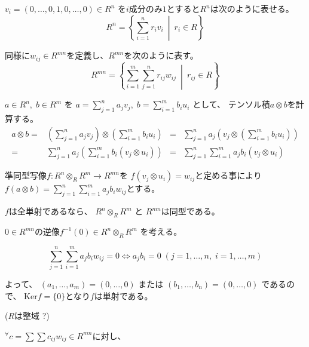 \documentclass[12pt,b5paper]{ltjsarticle}
\begin{document}
\begin{enumerate}
      $v_{i}=(0,\dots,0,1,0,\dots,0) \in R^{n}$
      を$i$成分のみ$1$とすると$R^{n}$は次のように表せる。
      \begin{equation}
       R^{n} = \left \{ \sum_{i=1}^{n} r_{i}v_{i} \:\middle|\: r_{i} \in R \right \}
      \end{equation}

      同様に$w_{ij}\in R^{mn}$を定義し、$R^{mn}$を次のように表す。
      \begin{equation}
       R^{mn} = \left \{ \sum_{i=1}^{m} \sum_{j=1}^{n} r_{ij}w_{ij} \:\middle|\: r_{ij} \in R \right \}
      \end{equation}

      $a\in R^{n}, \; b\in R^{m}$
      を
      $a=\sum_{j=1}^{n}a_{j}v_{j}, \; b=\sum_{i=1}^{m}b_{i}u_{i}$
      として、
      テンソル積$a\otimes b$を計算する。
      \begin{align}
       a\otimes b =& \left( \sum_{j=1}^{n}a_{j}v_{j} \right) \otimes \left( \sum_{i=1}^{m}b_{i}u_{i} \right) &
       =& \sum_{j=1}^{n} a_{j} \left( v_{j} \otimes \left( \sum_{i=1}^{m}b_{i}u_{i} \right)\right)\\
       =& \sum_{j=1}^{n} a_{j} \left(  \sum_{i=1}^{m}b_{i} \left( v_{j} \otimes u_{i} \right)\right) &
       =& \sum_{j=1}^{n} \sum_{i=1}^{m} a_{j} b_{i} \left( v_{j} \otimes u_{i} \right)
      \end{align}


      準同型写像$f: R^{n}\otimes_{R} R^{m} \to R^{mn}$を
      $f(v_{j} \otimes u_{i}) = w_{ij}$と定める事により
      $f(a\otimes b) = \sum_{j=1}^{n} \sum_{i=1}^{m} a_{j} b_{i} w_{ij}$とする。

      $f$は全単射であるなら、
      $R^{n}\otimes_{R} R^{m}$
      と $R^{mn}$は同型である。


      $0\in R^{mn}$の逆像$f^{-1}(0)\in R^{n}\otimes_{R} R^{m}$
      を考える。

      \begin{equation}
       \sum_{j=1}^{n} \sum_{i=1}^{m} a_{j} b_{i} w_{ij} = 0
        \Longleftrightarrow a_{j} b_{i} = 0 \; (j=1,\dots,n,\; i=1,\dots,m)
      \end{equation}

      よって、
      $(a_{1},\dots,a_{m})=(0,\dots,0)$
      または
      $(b_{1},\dots,b_{n})=(0,\dots,0)$
      であるので、
      $\mathrm{Ker}f=\{0\}$となり$f$は単射である。

      ($R$は整域 ?)

      ${}^{\forall}c =\sum \sum c_{ij}w_{ij} \in R^{mn}$に対し、


\end{enumerate}
\end{document}
